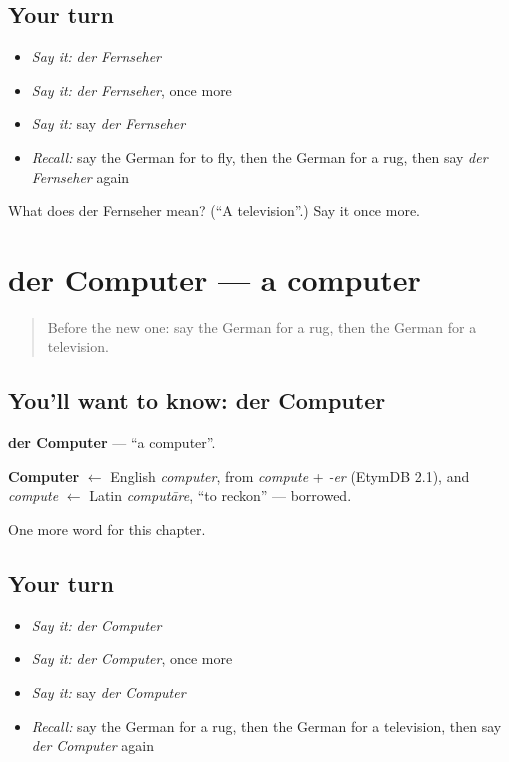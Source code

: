 \subsection*{Your turn}
\begin{itemize}
\raggedright
  \item \emph{Say it:} \emph{der Fernseher}
  \item \emph{Say it:} \emph{der Fernseher}, once more
  \item \emph{Say it:} say \emph{der Fernseher}
  \item \emph{Recall:} say the German for to fly, then the German for a rug, then say \emph{der Fernseher} again
\end{itemize}

\begin{tcolorbox}[breakable,colback=teal!4,colframe=teal!35!black,title={Before you move on}]
What does der Fernseher mean? (\textquotedblleft{}A television\textquotedblright{}.) Say it once more.
\end{tcolorbox}
\section[der Computer]{der Computer — a computer}

\label{lesson:GE-C112-computer}



\begin{quote}
Before the new one: say the German for a rug, then the German for a television.
\end{quote}

\subsection*{You'll want to know: der Computer}
\textbf{der Computer} — \textquotedblleft{}a computer\textquotedblright{}.

\begin{cousinweb}
\textbf{Computer} $\leftarrow$ English \emph{computer}, from \emph{compute} + \emph{-er} (EtymDB 2.1), and \emph{compute} $\leftarrow$ Latin \emph{computāre}, \textquotedblleft{}to reckon\textquotedblright{} — borrowed.
\end{cousinweb}

\begin{grammarlens}[title={What you've built}]
One more word for this chapter.
\end{grammarlens}

\subsection*{Your turn}
\begin{itemize}
\raggedright
  \item \emph{Say it:} \emph{der Computer}
  \item \emph{Say it:} \emph{der Computer}, once more
  \item \emph{Say it:} say \emph{der Computer}
  \item \emph{Recall:} say the German for a rug, then the German for a television, then say \emph{der Computer} again
\end{itemize}

